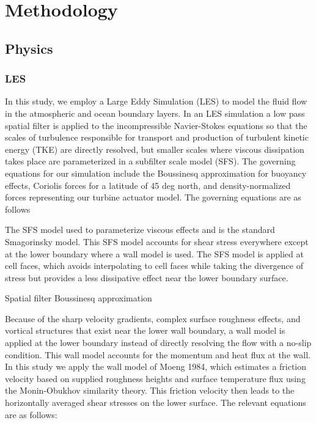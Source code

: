 \section{Methodology}

\subsection{Physics}


\subsubsection{LES}
In this study, we employ a Large Eddy Simulation (LES) to model the fluid flow in the atmospheric and ocean boundary layers.  In an LES simulation a low pass spatial filter is applied to the incompressible Navier-Stokes equations so that the scales of turbulence responsible for transport and production of turbulent kinetic energy (TKE) are directly resolved, but smaller scales where viscous dissipation takes place are parameterized in a subfilter scale model (SFS).  The governing equations for our simulation include the Boussinesq approximation for buoyancy effects, Coriolis forces for a latitude of 45 deg north, and density-normalized forces representing our turbine actuator model.  The governing equations are as follows


The SFS model used to parameterize viscous effects and is the standard Smagorinsky model.  This SFS model accounts for shear stress everywhere except at the lower boundary where a wall model is used.  The SFS model is applied at cell faces, which avoids interpolating to cell faces while taking the divergence of stress but provides a less dissipative effect near the lower boundary surface.  


Spatial filter
Boussinesq approximation

Because of the sharp velocity gradients, complex surface roughness effects, and vortical structures that exist near the lower wall boundary, a wall model is applied at the lower boundary instead of directly resolving the flow with a no-slip condition.  This wall model accounts for the momentum and heat flux at the wall.  In this study we apply the wall model of Moeng 1984, which estimates a friction velocity based on supplied roughness heights and surface temperature flux using the Monin-Obukhov similarity theory.  This friction velocity then leads to the horizontally averaged shear stresses on the lower surface.  The relevant equations are as follows:

